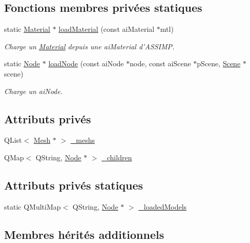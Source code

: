 \subsection*{Fonctions membres privées statiques}
\begin{DoxyCompactItemize}
\item 
static \hyperlink{class_material}{Material} $\ast$ \hyperlink{class_node_a0684a35524cc1e276bfefdd28cd452cf}{load\+Material} (const ai\+Material $\ast$mtl)
\begin{DoxyCompactList}\small\item\em Charge un \hyperlink{class_material}{Material} depuis une ai\+Material d'A\+S\+S\+I\+M\+P. \end{DoxyCompactList}\item 
static \hyperlink{class_node}{Node} $\ast$ \hyperlink{class_node_acf6db74c5840b203f4eee1239539ce31}{load\+Node} (const ai\+Node $\ast$node, const ai\+Scene $\ast$p\+Scene, \hyperlink{class_scene}{Scene} $\ast$scene)
\begin{DoxyCompactList}\small\item\em Charge un ai\+Node. \end{DoxyCompactList}\end{DoxyCompactItemize}
\subsection*{Attributs privés}
\begin{DoxyCompactItemize}
\item 
Q\+List$<$ \hyperlink{class_mesh}{Mesh} $\ast$ $>$ \hyperlink{class_node_aad5e459a1ed03d6e09ad7054f2014f5a}{\+\_\+meshs}
\item 
Q\+Map$<$ Q\+String, \hyperlink{class_node}{Node} $\ast$ $>$ \hyperlink{class_node_aac0c3b4b1f41b26ec5a22d77f067ec5b}{\+\_\+children}
\end{DoxyCompactItemize}
\subsection*{Attributs privés statiques}
\begin{DoxyCompactItemize}
\item 
static Q\+Multi\+Map$<$ Q\+String, \hyperlink{class_node}{Node} $\ast$ $>$ \hyperlink{class_node_a2e510fe62f9ef864668e32ef9269543c}{\+\_\+loaded\+Models}
\end{DoxyCompactItemize}
\subsection*{Membres hérités additionnels}


